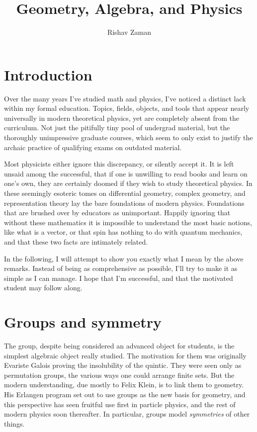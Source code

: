 \documentclass[12pt]{article}
\title{Geometry, Algebra, and Physics}
\author{Rishav Zaman}
\theoremstyle{definition}
\theoremstyle{remark}
\theoremstyle{example}
\theoremstyle{theorem}
\theoremstyle{lemma}
\begin{document}
\maketitle

\tableofcontents

\section{Introduction}

Over the many years I've studied math and physics, I've noticed a distinct lack within my formal education. Topics, fields, objects, and tools that appear nearly universally in modern theoretical physics, yet are completely absent from the curriculum. Not just the pitifully tiny pool of undergrad material, but the thoroughly unimpressive graduate courses, which seem to only exist to justify the archaic practice of qualifying exams on outdated material.

Most physicists either ignore this discrepancy, or silently accept it. It is left unsaid among the successful, that if one is unwilling to read books and learn on one's own, they are certainly doomed if they wish to study theoretical physics. In these seemingly esoteric tomes on differential geometry, complex geometry, and representation theory lay the bare foundations of modern physics. Foundations that are brushed over by educators as unimportant. Happily ignoring that without these mathematics it is impossible to understand the most basic notions, like what is a vector, or that spin has nothing to do with quantum mechanics, and that these two facts are intimately related.

In the following, I will attempt to show you exactly what I mean by the above remarks. Instead of being as comprehensive as possible, I'll try to make it as simple as I can manage. I hope that I'm successful, and that the motivated student may follow along.

\section{Groups and symmetry}

The group, despite being considered an advanced object for students, is the simplest algebraic object really studied. The motivation for them was originally Evariste Galois proving the insolubility of the quintic. They were seen only as permutation groups, the various ways one could arrange finite sets. But the modern understanding, due mostly to Felix Klein, is to link them to geometry. His Erlangen program set out to use groups as the new basis for geometry, and this perspective has seen fruitful use first in particle physics, and the rest of modern physics soon thereafter. In particular, groups model \textit{symmetries} of other things. 
\end{document}
